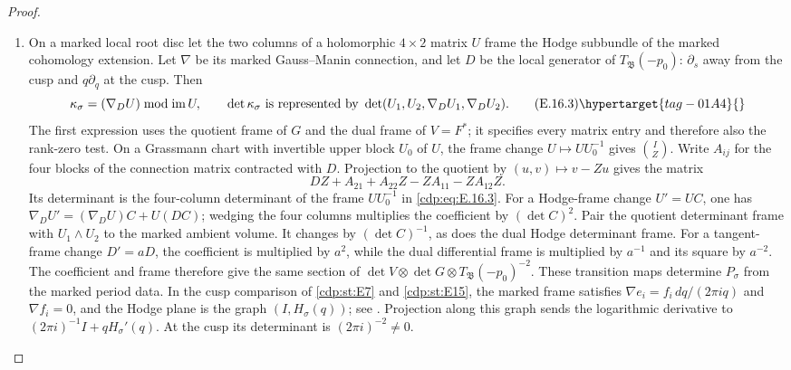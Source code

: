 \begin{proof}
\begin{enumerate}[label=\arabic*.,leftmargin=*]
\item On a marked local root disc let the two columns of a holomorphic $4\times2$ matrix $U$ frame the Hodge subbundle of the marked cohomology extension. Let $\nabla$ be its marked Gauss--Manin connection, and let $D$ be the local generator of $T_{\mathfrak B}(-p_0)$: $\partial_s$ away from the cusp and $q\partial_q$ at the cusp. Then
\[
 \kappa_\sigma=(\nabla_DU)\bmod\operatorname{im}U,
 \qquad
 \det\kappa_\sigma\ \text{is represented by}\
 \det(U_1,U_2,\nabla_DU_1,\nabla_DU_2).              \tag{E.16.3}\hypertarget{tag-01A4}{}\label{cdp:eq:E.16.3}
\]
The first expression uses the quotient frame of $G$ and the dual frame
of $V=F^*$; it specifies every matrix entry and therefore also the
rank-zero test. On a Grassmann chart with invertible upper block $U_0$
of $U$, the frame change $U\mapsto UU_0^{-1}$ gives
$\binom{I}{Z}$. Write $A_{ij}$ for the four blocks of the connection
matrix contracted with $D$. Projection to the quotient by
$(u,v)\mapsto v-Zu$ gives the matrix
\[
 DZ+A_{21}+A_{22}Z-ZA_{11}-ZA_{12}Z.
\]
Its determinant is the four-column determinant of the frame
$UU_0^{-1}$ in \eqref{cdp:eq:E.16.3}. For a Hodge-frame change $U'=UC$, one has
$\nabla_DU'=(\nabla_DU)C+U(DC)$; wedging the four columns
multiplies the coefficient by $(\det C)^2$. Pair the quotient
determinant frame with $U_1\wedge U_2$ to the marked ambient
volume. It changes by $(\det C)^{-1}$, as does the dual Hodge
determinant frame.
For a tangent-frame change $D'=aD$, the coefficient is multiplied
by $a^2$, while the dual differential frame is multiplied by
$a^{-1}$ and its square by $a^{-2}$. The coefficient and frame
therefore give the same section of
$\det V\otimes\det G\otimes T_{\mathfrak B}(-p_0)^{-2}$.
These transition maps determine $P_\sigma$ from the marked period data. In the cusp comparison of \ref{cdp:st:E7} and \ref{cdp:st:E15},
the marked frame satisfies
$\nabla e_i=f_i\,dq/(2\pi iq)$ and $\nabla f_i=0$,
and the Hodge plane is the graph $(I,H_\sigma(q))$;
see \cite[Proposition~4.1, p.~12]{Viaclovsky2026Combs}.
Projection along this graph sends the logarithmic derivative to
$(2\pi i)^{-1}I+qH_\sigma'(q)$. At the cusp its determinant is
$(2\pi i)^{-2}\ne0$.

\end{enumerate}
\end{proof}